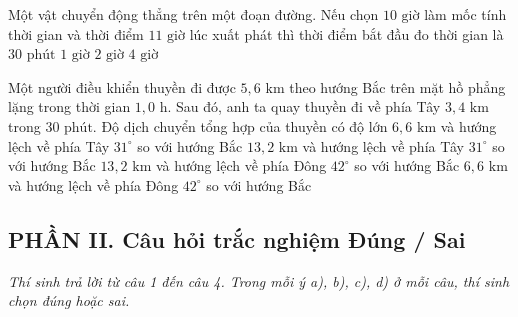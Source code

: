 \begin{ex} Một vật chuyển động thẳng trên một đoạn đường. Nếu chọn $10\text{ giờ}$ làm mốc tính thời gian và thời điểm $11\text{ giờ}$ lúc xuất phát thì thời điểm bắt đầu đo thời gian là
\choice
{$30\text{ phút}$}
{\True $1\text{ giờ}$}
{$2\text{ giờ}$}
{$4\text{ giờ}$}
\end{ex}

\begin{ex} Một người điều khiển thuyền đi được $5{,}6\text{ km}$ theo hướng Bắc trên mặt hồ phẳng lặng trong thời gian $1{,}0\text{ h}$. Sau đó, anh ta quay thuyền đi về phía Tây $3{,}4\text{ km}$ trong $30\text{ phút}$. Độ dịch chuyển tổng hợp của thuyền có độ lớn
\choice
{\True $6{,}6\text{ km}$ và hướng lệch về phía Tây $31^\circ$ so với hướng Bắc}
{$13{,}2\text{ km}$ và hướng lệch về phía Tây $31^\circ$ so với hướng Bắc}
{$13{,}2\text{ km}$ và hướng lệch về phía Đông $42^\circ$ so với hướng Bắc}
{$6{,}6\text{ km}$ và hướng lệch về phía Đông $42^\circ$ so với hướng Bắc}
\end{ex}

\setcounter{ex}{0}
\subsection*{PHẦN II. Câu hỏi trắc nghiệm Đúng / Sai}
\textit{Thí sinh trả lời từ câu 1 đến câu 4. Trong mỗi ý a), b), c), d) ở mỗi câu, thí sinh chọn đúng hoặc sai.}

